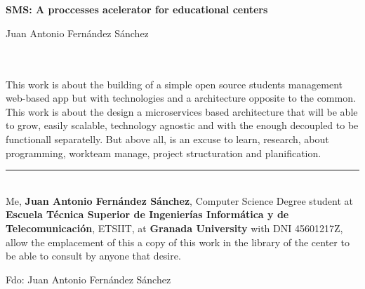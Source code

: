 \chapter*{}





\cleardoublepage
\thispagestyle{empty}

\begin{center}
{\large\bfseries SMS: A proccesses acelerator for educational centers}\\
\end{center}
\begin{center}
Juan Antonio Fernández Sánchez\\
\end{center}

\\

\vspace{0.7cm}
\\

This work is about the building of a simple  open source students management
web-based app but with technologies and a architecture opposite to the common.
This work is about the design a microservices based architecture that will be
able to grow, easily scalable, technology agnostic and with the enough decoupled
to be functionall separatelly. But above all, is an excuse to learn, research,
about programming, workteam manage, project structuration and planification.
\cleardoublepage

\thispagestyle{empty}

\noindent\rule[-1ex]{\textwidth}{2pt}\\[4.5ex]


Me, \textbf{Juan Antonio Fernández Sánchez}, Computer Science Degree student at
\textbf{Escuela Técnica Superior de Ingenierías Informática y de Telecomunicación},
ETSIIT, at \textbf{Granada University} with DNI 45601217Z, allow the emplacement of this a copy
of this work in the library of the center to be able to consult by anyone that desire.

\vspace{6cm}

\noindent Fdo: Juan Antonio Fernández Sánchez

\vspace{2cm}


